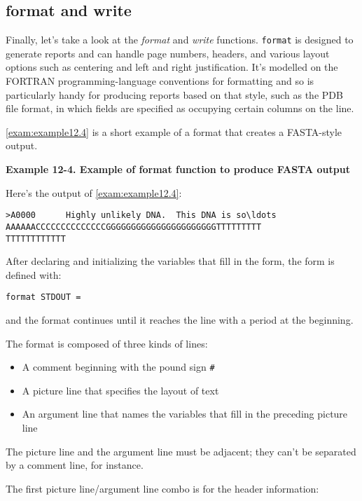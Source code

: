 \subsection{format and write}
Finally, let's take a look at the \textit{format} and \textit{write} functions. \verb|format| is designed to generate reports and can handle page numbers, headers, and various layout options such as centering and left and right justification. It's modelled on the FORTRAN programming-language conventions for formatting and so is particularly handy for producing reports based on that style, such as the PDB file format, in which fields are specified as occupying certain columns on the line.

\autoref{exam:example12.4} is a short example of a format that creates a FASTA-style output. 

\textbf{Example 12-4. Example of format function to produce FASTA output}


Here's the output of \autoref{exam:example12.4}:

\begin{lstlisting}
>A0000      Highly unlikely DNA.  This DNA is so\ldots
AAAAAACCCCCCCCCCCCCCGGGGGGGGGGGGGGGGGGGGGGTTTTTTTTT
TTTTTTTTTTTT
\end{lstlisting}

After declaring and initializing the variables that fill in the form, the form is defined with: 

\begin{lstlisting}
format STDOUT =
\end{lstlisting}

and the format continues until it reaches the line with a period at the beginning.

The format is composed of three kinds of lines:

\begin{itemize}
  \item A comment beginning with the pound sign \verb|#|
  \item A picture line that specifies the layout of text
  \item An argument line that names the variables that fill in the preceding picture line
\end{itemize}

The picture line and the argument line must be adjacent; they can't be separated by a comment line, for instance.

The first picture line/argument line combo is for the header information: 


